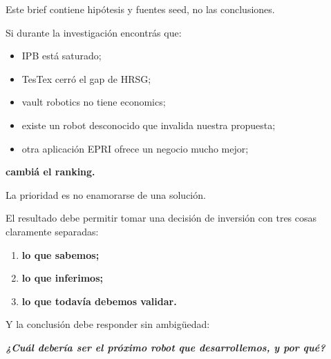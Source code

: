 \documentclass[11pt,a4paper]{article}
\newenvironment{callout}
  {\par\medskip\noindent
   \begin{lrbox}{\calloutbox}%
   \begin{minipage}{\dimexpr\linewidth-2.2em\relax}\itshape}
  {\end{minipage}\end{lrbox}%
   \noindent{\color{accent}\vrule width 2.5pt}\hspace{0.6em}%
   \colorbox{calloutbg}{\usebox{\calloutbox}}\par\medskip}
\begin{document}
Este brief contiene hipótesis y fuentes seed, no las conclusiones.

Si durante la investigación encontrás que:

\begin{itemize}
\item IPB está saturado;
\item TesTex cerró el gap de HRSG;
\item vault robotics no tiene economics;
\item existe un robot desconocido que invalida nuestra propuesta;
\item otra aplicación EPRI ofrece un negocio mucho mejor;
\end{itemize}

\textbf{cambiá el ranking.}

La prioridad es no enamorarse de una solución.

El resultado debe permitir tomar una decisión de inversión con tres cosas claramente separadas:

\begin{enumerate}
\item \textbf{lo que sabemos;}
\item \textbf{lo que inferimos;}
\item \textbf{lo que todavía debemos validar.}
\end{enumerate}

Y la conclusión debe responder sin ambigüedad:

\begin{callout}
\textbf{¿Cuál debería ser el próximo robot que desarrollemos, y por qué?}
\end{callout}
\end{document}
